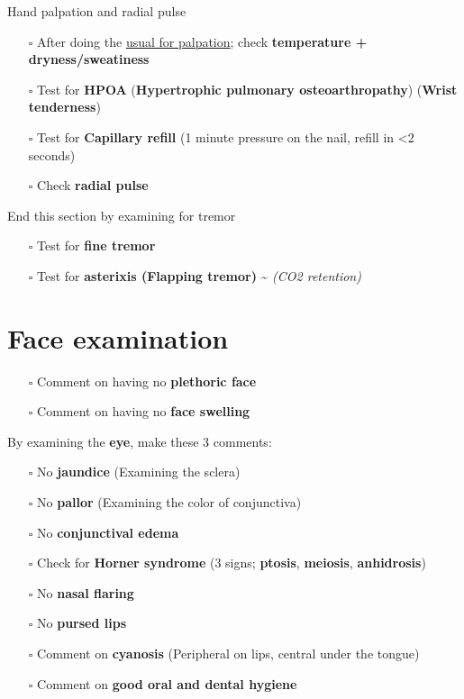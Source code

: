 \documentclass[
  13.5pt,
  a4paper,
  DIV=11,
  numbers=noendperiod]{scrreprt}
\providecommand{\tightlist}{%
  \setlength{\itemsep}{0pt}\setlength{\parskip}{0pt}}
\begin{document}
Hand palpation and radial pulse

\begin{itemize}
\tightlist
\item[$\square$]
  After doing the \href{miscellaneous.qmd}{usual for palpation}; check
  \textbf{temperature + dryness/sweatiness}
\item[$\square$]
  Test for \textbf{HPOA} (\textbf{Hypertrophic pulmonary
  osteoarthropathy}) (\textbf{Wrist tenderness})
\item[$\square$]
  Test for \textbf{Capillary refill} (1 minute pressure on the nail,
  refill in \textless2 seconds)
\item[$\square$]
  Check \textbf{radial pulse}
\end{itemize}

End this section by examining for tremor

\begin{itemize}
\tightlist
\item[$\square$]
  Test for \textbf{fine tremor}
\item[$\square$]
  Test for \textbf{asterixis (Flapping tremor)} \textasciitilde{}
  \emph{(CO2 retention)}
\end{itemize}

\section{Face examination}\label{face-examination}

\begin{itemize}
\tightlist
\item[$\square$]
  Comment on having no \textbf{plethoric face}
\item[$\square$]
  Comment on having no \textbf{face swelling}
\end{itemize}

By examining the \textbf{eye}, make these 3 comments:

\begin{itemize}
\tightlist
\item[$\square$]
  No \textbf{jaundice} (Examining the sclera)
\item[$\square$]
  No \textbf{pallor} (Examining the color of conjunctiva)
\item[$\square$]
  No \textbf{conjunctival edema}
\item[$\square$]
  Check for \textbf{Horner syndrome} (3 signs; \textbf{ptosis},
  \textbf{meiosis}, \textbf{anhidrosis})
\item[$\square$]
  No \textbf{nasal flaring}
\item[$\square$]
  No \textbf{pursed lips}
\item[$\square$]
  Comment on \textbf{cyanosis} (Peripheral on lips, central under the
  tongue)
\item[$\square$]
  Comment on \textbf{good oral and dental hygiene}
\end{itemize}
\end{document}
